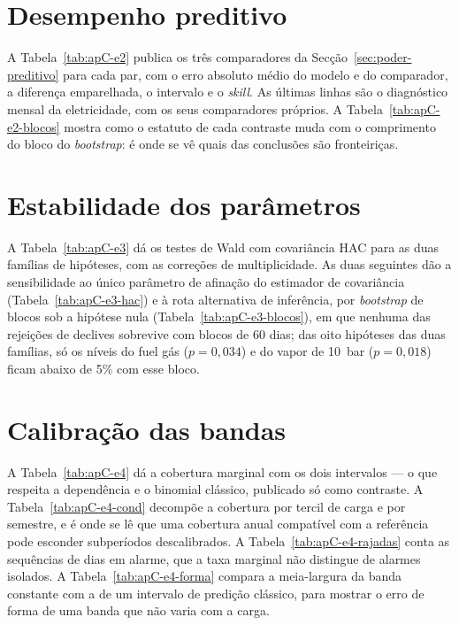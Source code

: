 

\section{Desempenho preditivo}
\label{sec:apC-e2}

A Tabela~\ref{tab:apC-e2} publica os três comparadores da
Secção~\ref{sec:poder-preditivo} para cada par, com o erro absoluto médio do
modelo e do comparador, a diferença emparelhada, o intervalo e o \emph{skill}.
As últimas linhas são o diagnóstico mensal da eletricidade, com os seus
comparadores próprios. A Tabela~\ref{tab:apC-e2-blocos} mostra como o estatuto
de cada contraste muda com o comprimento do bloco do \emph{bootstrap}: é onde
se vê quais das conclusões são fronteiriças.




\section{Estabilidade dos parâmetros}
\label{sec:apC-e3}

A Tabela~\ref{tab:apC-e3} dá os testes de Wald com covariância HAC para as duas
famílias de hipóteses, com as correções de multiplicidade. As duas seguintes
dão a sensibilidade ao único parâmetro de afinação do estimador de covariância
(Tabela~\ref{tab:apC-e3-hac}) e à rota alternativa de inferência, por
\emph{bootstrap} de blocos sob a hipótese nula (Tabela~\ref{tab:apC-e3-blocos}),
em que nenhuma das rejeições de declives sobrevive com blocos de 60 dias; das
oito hipóteses das duas famílias, só os níveis do fuel gás ($p = 0{,}034$) e do
vapor de 10~bar ($p = 0{,}018$) ficam abaixo de 5\% com esse bloco.





\section{Calibração das bandas}
\label{sec:apC-e4}

A Tabela~\ref{tab:apC-e4} dá a cobertura marginal com os dois intervalos ---
o que respeita a dependência e o binomial clássico, publicado só como
contraste. A Tabela~\ref{tab:apC-e4-cond} decompõe a cobertura por tercil de
carga e por semestre, e é onde se lê que uma cobertura anual compatível com a
referência pode esconder subperíodos descalibrados. A
Tabela~\ref{tab:apC-e4-rajadas} conta as sequências de dias em alarme, que
a taxa marginal não distingue de alarmes isolados. A
Tabela~\ref{tab:apC-e4-forma} compara a meia-largura da banda constante com a
de um intervalo de predição clássico, para mostrar o erro de forma de uma banda
que não varia com a carga.

